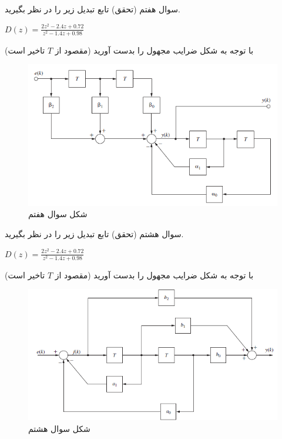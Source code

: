 \documentclass{article}
\begin{document}
\begin{problem}{سوال هفتم}
	(تحقق) تابع تبدیل زیر را در نظر بگیرید.
	
	\centering
	$D(z) = \frac{2z^2 - 2.4z + 0.72}{z^2 - 1.4z + 0.98}$
	
	\raggedright
	با توجه به شکل ضرایب مجهول را بدست آورید (مقصود از $T$ تاخیر است)
\end{problem}
\begin{figure}
	\includegraphics[width=\linewidth]{Second Series/2.png}
	\caption{شکل سوال هفتم}
\end{figure}

\begin{problem}{سوال هشتم}
	(تحقق) تابع تبدیل زیر را در نظر بگیرید.
	
	\centering
	$D(z) = \frac{2z^2 - 2.4z + 0.72}{z^2 - 1.4z + 0.98}$
	
	\raggedright
	با توجه به شکل ضرایب مجهول را بدست آورید (مقصود از $T$ تاخیر است)

\end{problem}
\begin{figure}
	\includegraphics[width=\linewidth]{Second Series/3.png}
	\caption{شکل سوال هشتم}
\end{figure}
\end{document}
